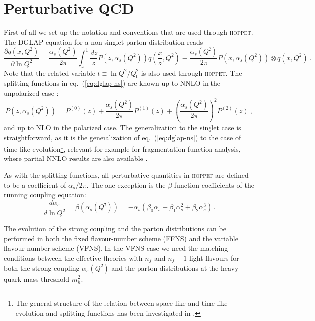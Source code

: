 \documentclass[12pt]{article}
\newcommand{\lp}{\left(}
\newcommand{\rp}{\right)}
\newcommand{\aq}{\alpha_s\left( Q^2 \right)}
\newcommand{\as}{\alpha_s}
\newcommand{\hoppet}{\textsc{hoppet}\xspace}
\begin{document}
\section{Perturbative QCD}
\label{sec:pqcd}
First of all we set up the notation and
conventions that are used through \hoppet. The DGLAP
equation for a non-singlet parton distribution reads
\begin{equation}
  \label{eq:dglap-ns}
  \frac{\partial q(x,Q^2)}{\partial \ln Q^2} = 
\frac{\aq}{2\pi}\int_x^1 \frac{dz}{z}
  P(z,\aq) q\lp \frac{x}{z},Q^2\rp \equiv 
\frac{\aq}{2\pi}  P(x,\aq) \otimes q\lp x,Q^2\rp \ .
\end{equation}
Note that the related variable $t\equiv \ln Q^2/Q_0^2$ is also used
through \hoppet.
The splitting functions in  eq.~(\ref{eq:dglap-ns})
are known up to NNLO in the 
unpolarized case \cite{NNLO-NS,NNLO-singlet}:
\begin{equation}
  \label{eq:dpdf}
   P(z,\aq)=P^{(0)}(z)+\frac{\aq}{2\pi}P^{(1)}(z)+
\lp \frac{\aq}{2\pi} \rp^2 P^{(2)}(z) \ ,
\end{equation}
and up to NLO in the polarized case.
The generalization to the singlet case is straightforward, as it
is the generalization of eq.~(\ref{eq:dglap-ns}) to the case
of time-like evolution\footnote{
The general structure of the relation between space-like
and time-like evolution and splitting functions
 has been investigated in \cite{Dokshitzer:2005bf}.}, 
relevant for example for fragmentation function analysis,
where partial NNLO results
are also available \cite{Mitov:2006ic}.


As with the splitting functions, all perturbative quantities in
\hoppet are defined to be a coefficient of $\as/2\pi$. The one
exception is the $\beta$-function coefficients of the running
coupling equation:
\begin{equation}
  \label{eq:as-ev}
  \frac{d\as}{d\ln Q^2} = \beta\lp \aq\rp = -\as (\beta_0\as +
  \beta_1\as^2 + 
  \beta_2\as^3) \ .
\end{equation}

The evolution of the strong coupling and the parton distributions can
be performed in both the fixed flavour-number scheme (FFNS) and the 
variable flavour-number scheme (VFNS). In the VFNS case we 
need the matching conditions between the effective
theories with $n_f$ and $n_{f}+1$ light flavours for both the strong 
coupling $\aq$ and the parton distributions at the heavy quark
mass threshold $m_h^2$.
\end{document}
